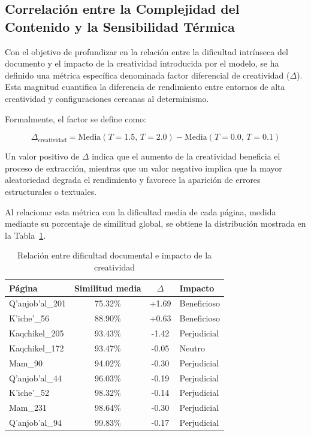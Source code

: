 \subsection{Correlación entre la Complejidad del Contenido y la Sensibilidad Térmica}

Con el objetivo de profundizar en la relación entre la dificultad intrínseca del documento y el impacto de la creatividad introducida por el modelo, se ha definido una métrica específica denominada factor diferencial de creatividad (\(\Delta\)). Esta magnitud cuantifica la diferencia de rendimiento entre entornos de alta creatividad y configuraciones cercanas al determinismo.

Formalmente, el factor se define como:

\[
\Delta_{\text{creatividad}}
=
\text{Media}(T=1.5,\,T=2.0)
-
\text{Media}(T=0.0,\,T=0.1)
\]

Un valor positivo de \(\Delta\) indica que el aumento de la creatividad beneficia el proceso de extracción, mientras que un valor negativo implica que la mayor aleatoriedad degrada el rendimiento y favorece la aparición de errores estructurales o textuales.

Al relacionar esta métrica con la dificultad media de cada página, medida mediante su porcentaje de similitud global, se obtiene la distribución mostrada en la Tabla~\ref{tab:delta_creatividad}.

\begin{table}[ht]
\centering
\caption{Relación entre dificultad documental e impacto de la creatividad}
\label{tab:delta_creatividad}
\begin{tabular}{lccp{3.5cm}}
\hline
Página & Similitud media & \(\Delta\) & Impacto \\ \hline
Q'anjob'al\_201 & 75.32\% & +1.69 & Beneficioso \\
K'iche'\_56 & 88.90\% & +0.63 & Beneficioso \\
Kaqchikel\_205 & 93.43\% & -1.42 & Perjudicial \\
Kaqchikel\_172 & 93.47\% & -0.05 & Neutro \\
Mam\_90 & 94.02\% & -0.30 & Perjudicial \\
Q'anjob'al\_44 & 96.03\% & -0.19 & Perjudicial \\
K'iche'\_52 & 98.32\% & -0.14 & Perjudicial \\
Mam\_231 & 98.64\% & -0.30 & Perjudicial \\
Q'anjob'al\_94 & 99.83\% & -0.17 & Perjudicial \\ \hline
\end{tabular}
\end{table}

